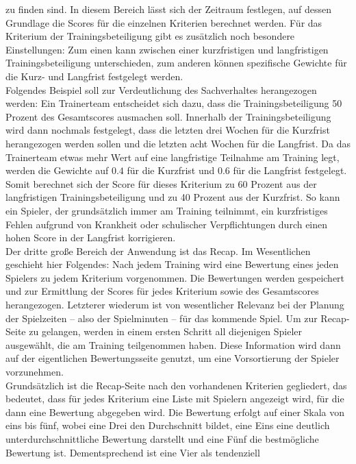 zu finden sind. In diesem Bereich lässt sich der Zeitraum festlegen, auf dessen 
Grundlage die Scores für die einzelnen Kriterien berechnet werden. Für das 
Kriterium der Trainingsbeteiligung gibt es zusätzlich noch besondere Einstellungen: Zum 
einen kann zwischen einer kurzfristigen und langfristigen Trainingsbeteiligung 
unterschieden, zum anderen können spezifische Gewichte für die Kurz- und Langfrist 
festgelegt werden. \\ 
Folgendes Beispiel soll zur Verdeutlichung des Sachverhaltes herangezogen werden: 
Ein Trainerteam entscheidet sich dazu, dass die Trainingsbeteiligung 50 Prozent 
des Gesamtscores ausmachen soll. Innerhalb der Trainingsbeteiligung wird dann 
nochmals festgelegt, dass die letzten drei Wochen für die Kurzfrist herangezogen 
werden sollen und die letzten acht Wochen für die Langfrist. Da das Trainerteam 
etwas mehr Wert auf eine langfristige Teilnahme am Training legt, werden die 
Gewichte auf $ 0.4 $ für die Kurzfrist und $ 0.6 $ für die Langfrist festgelegt. 
Somit berechnet sich der Score für dieses Kriterium zu 60 Prozent aus der 
langfristigen Trainingsbeteiligung und zu 40 Prozent aus der Kurzfrist. So kann 
ein Spieler, der grundsätzlich immer am Training teilnimmt, ein kurzfristiges 
Fehlen aufgrund von Krankheit oder schulischer Verpflichtungen durch einen hohen 
Score in der Langfrist korrigieren. \\ 
Der dritte große Bereich der Anwendung ist das Recap. Im Wesentlichen geschieht 
hier Folgendes: Nach jedem Training wird eine Bewertung eines jeden Spielers zu jedem 
Kriterium vorgenommen. Die Bewertungen werden gespeichert und zur Ermittlung der 
Scores für jedes Kriterium sowie des Gesamtscores herangezogen. Letzterer wiederum 
ist von wesentlicher Relevanz bei der Planung der Spielzeiten -- also der 
Spielminuten -- für das kommende Spiel. Um zur Recap-Seite zu gelangen, werden in 
einem ersten Schritt all diejenigen Spieler ausgewählt, die am Training 
teilgenommen haben. Diese Information wird dann auf der eigentlichen 
Bewertungsseite genutzt, um eine Vorsortierung der Spieler vorzunehmen. \\ 
Grundsätzlich ist die Recap-Seite nach den vorhandenen Kriterien 
gegliedert, das bedeutet, dass für jedes Kriterium eine Liste mit Spielern 
angezeigt wird, für die dann eine Bewertung abgegeben wird. Die Bewertung erfolgt 
auf einer Skala von eins bis fünf, wobei eine Drei den Durchschnitt bildet, eine 
Eins eine deutlich unterdurchschnittliche Bewertung darstellt und eine Fünf die 
bestmögliche Bewertung ist. Dementsprechend ist eine Vier als tendenziell 
